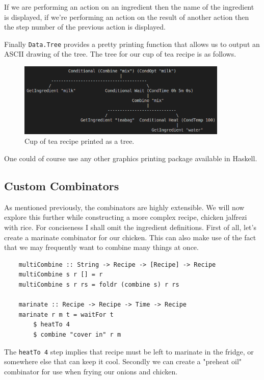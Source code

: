 \documentclass[11pt]{article}
\begin{document}
If we are performing an action on an ingredient then the name of the ingredient is
displayed, if we're performing an action on the result of another action then the
step number of the previous action is displayed.

\medbreak

Finally \texttt{Data.Tree} provides a pretty printing function that allows us
to output an ASCII drawing of the tree. The tree for our cup of tea recipe is
as follows.

\begin{figure}[h]
\includegraphics[width=10cm, keepaspectratio]{cupOfTea.png}
\centering
\caption{Cup of tea recipe printed as a tree.}
\end{figure}

One could of course use any other graphics printing package available in Haskell.

\subsection{Custom Combinators}

As mentioned previously, the combinators are highly extensible. We will now explore this
further while constructing a more complex recipe, chicken jalfrezi with rice.
For conciseness I shall omit the ingredient definitions. First of all, let's
create a marinate combinator for our chicken. This can also make use of the
fact that we may frequently want to combine many things at once.

\begin{lstlisting}
    multiCombine :: String -> Recipe -> [Recipe] -> Recipe
    multiCombine s r [] = r
    multiCombine s r rs = foldr (combine s) r rs

    marinate :: Recipe -> Recipe -> Time -> Recipe
    marinate r m t = waitFor t
        $ heatTo 4
        $ combine "cover in" r m
\end{lstlisting}

The \texttt{heatTo 4} step implies that recipe must be left to marinate in the fridge,
or somewhere else that can keep it cool. Secondly we can create a "preheat oil" combinator
for use when frying our onions and chicken.
\end{document}
